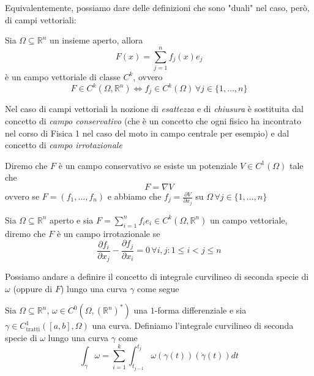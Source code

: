 Equivalentemente, possiamo dare delle definizioni che sono "duali" nel caso, però, di campi vettoriali:

\vspace{0.5cm}
\begin{definition}[\textcolor{blue}{campo vettoriale di classe $C^k$}]
	Sia $\Omega \subseteq \mathbb{R}^n$ un insieme aperto, allora $$F(x)=\sum_{j=1}^n f_j(x)e_j$$ è un campo vettoriale di classe $C^k$, ovvero 
	$$F \in C^k(\Omega, \mathbb{R}^n) \iff f_j \in C^k(\Omega) \, \forall j \in \{1, \ldots, n\} $$
\end{definition}

Nel caso di campi vettoriali la nozione di \emph{esattezza} e di \emph{chiusura} è sostituita dal concetto di \emph{campo conservativo} (che è un concetto che ogni fisico ha incontrato nel corso di Fisica 1
nel caso del moto in campo centrale per esempio) e dal concetto di \emph{campo irrotazionale}

\vspace{0.5cm}
\begin{definition}[\textcolor{blue}{campo conservativo}]
	Diremo che $F$ è un campo conservativo se esiste un potenziale $V \in C^1(\Omega)$ tale che
	$$
	F = \nabla V
	$$
	ovvero se $F=(f_1, \ldots, f_n)$ e abbiamo che $f_j = \frac{\partial V}{\partial x_j}$ su $\Omega \, \forall j \in \{1, \ldots, n \}$
\end{definition}

\vspace{0.5cm}
\begin{definition}[\textcolor{blue}{campo irrotazionale}]
	Sia  $\Omega \subseteq \mathbb{R}^n$ aperto e sia $F = \sum_{i=1}^n f_i e_i \in C^k(\Omega, \mathbb{R}^n)$ un campo vettoriale, diremo che $F$ è un campo irrotazionale se
	$$
	\frac{\partial f_i}{\partial x_j} - \frac{\partial f_j}{\partial x_i} = 0 \, \forall i, j: 1 \leq i < j \leq n
	$$
\end{definition}

Possiamo andare a definire il concetto di integrale curvilineo di seconda specie di $\omega$ (oppure di $F$) lungo una curva $\gamma$ come segue

\vspace{0.5cm}
\begin{definition}[\textcolor{blue}{integrale curvilineo di seconda specie di $\omega$ lungo una curva $\gamma$}]
	Sia $\Omega \subseteq \mathbb{R}^n$, $\omega \in C^0(\Omega, (\mathbb{R}^n)^*)$ una $1$-forma differenziale e sia $\gamma \in C^1_{\text{tratti}}([a,b], \Omega)$ una curva. Definiamo l'integrale curvilineo di seconda specie di 
	$\omega$ lungo una curva $\gamma$ come
	$$
		\int_\gamma \omega = \sum_{i=1}^k \int_{t_{j-1}}^{t_j} \omega(\gamma(t))(\dot{\gamma}(t))dt
	$$
\end{definition}

